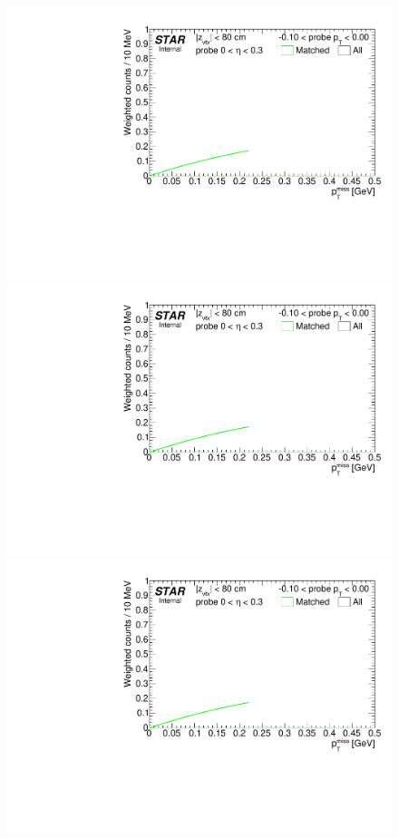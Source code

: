\begin{figure}[h!]
{}~
\parbox{0.24\textwidth}{
  \centering
  \includegraphics[width=\linewidth,page=5]{graphics/correctionsToEff/TOF_tagAndProbe/Fitting_effVsPt_mc_ETABINS_B.CPT2.pdf}\\
  \includegraphics[width=\linewidth,page=7]{graphics/correctionsToEff/TOF_tagAndProbe/Fitting_effVsPt_mc_ETABINS_B.CPT2.pdf}\\
  \includegraphics[width=\linewidth,page=9]{graphics/correctionsToEff/TOF_tagAndProbe/Fitting_effVsPt_mc_ETABINS_B.CPT2.pdf}\\
}
\end{figure}

